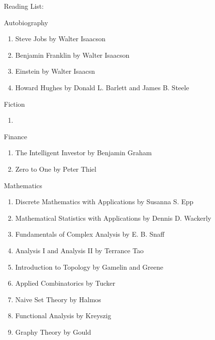 \documentclass{article}
\begin{document}
\Huge Reading List: 

\hrulefill

\LARGE Autobiography

\normalsize 
    \begin{enumerate}
        \item Steve Jobs by Walter Isaacson
        \item Benjamin Franklin by Walter Isaacson
        \item Einstein by Walter Isaacsn 
        \item Howard Hughes by Donald L. Barlett and James B. Steele
    \end{enumerate}

\hrulefill

\LARGE Fiction

\normalsize
    \begin{enumerate}
        \item 
    \end{enumerate}

\hrulefill

\LARGE Finance

\normalsize
    \begin{enumerate}
        \item The Intelligent Investor by Benjamin Graham
        \item Zero to One by Peter Thiel
    \end{enumerate}

\hrulefill

\LARGE Mathematics

\normalsize
    \begin{enumerate}
        \item Discrete Mathematics with Applications by Susanna S. Epp
        \item Mathematical Statistics with Applications by Dennis D. Wackerly
        \item Fundamentals of Complex Analysis by E. B. Snaff
        \item Analysis I and Analysis II by Terrance Tao
        \item Introduction to Topology by Gamelin and Greene
        \item Applied Combinatorics by Tucker
        \item Naive Set Theory by Halmos
        \item Functional Analysis by Kreyszig
        \item Graphy Theory by Gould
    \end{enumerate}
\end{document}
